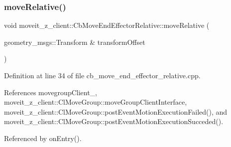 \subsubsection{\texorpdfstring{move\+Relative()}{moveRelative()}}
{\footnotesize\ttfamily void moveit\+\_\+z\+\_\+client\+::\+Cb\+Move\+End\+Effector\+Relative\+::move\+Relative (\begin{DoxyParamCaption}\item[{geometry\+\_\+msgs\+::\+Transform \&}]{transform\+Offset }\end{DoxyParamCaption})}



Definition at line 34 of file cb\+\_\+move\+\_\+end\+\_\+effector\+\_\+relative.\+cpp.



References movegroup\+Client\+\_\+, moveit\+\_\+z\+\_\+client\+::\+Cl\+Move\+Group\+::move\+Group\+Client\+Interface, moveit\+\_\+z\+\_\+client\+::\+Cl\+Move\+Group\+::post\+Event\+Motion\+Execution\+Failed(), and moveit\+\_\+z\+\_\+client\+::\+Cl\+Move\+Group\+::post\+Event\+Motion\+Execution\+Succeded().



Referenced by on\+Entry().


